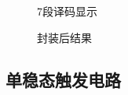 \documentclass[UTF8,titlepage,a4paper]{ctexart}
\numberwithin{figure}{section}
\begin{document}
\begin{enumerate}
\begin{figure}[H]
      \caption{7段译码显示}
      \label{}
     \end{figure}
     \begin{figure}[H]
     \centering
      \caption{封装后结果}
      \label{}
     \end{figure}
\end{enumerate}

\subsection{单稳态触发电路}
\end{document}
